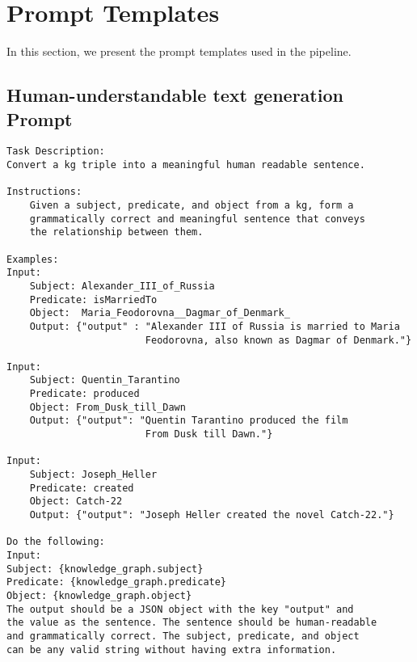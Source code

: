 \chapter{Prompt Templates}\label{ch:prompt-templates}
In this section, we present the prompt templates used in the pipeline.
\section{Human-understandable text generation Prompt}\label{sec:prompt-templates:human-understandable}
\begin{Verbatim}[fontsize=\small, frame=single, label={Prompt template for generating human-readable text}]
Task Description:
Convert a kg triple into a meaningful human readable sentence.

Instructions:
    Given a subject, predicate, and object from a kg, form a
    grammatically correct and meaningful sentence that conveys
    the relationship between them.

Examples:
Input:
    Subject: Alexander_III_of_Russia
    Predicate: isMarriedTo
    Object:  Maria_Feodorovna__Dagmar_of_Denmark_
    Output: {"output" : "Alexander III of Russia is married to Maria
                        Feodorovna, also known as Dagmar of Denmark."}

Input:
    Subject: Quentin_Tarantino
    Predicate: produced
    Object: From_Dusk_till_Dawn
    Output: {"output": "Quentin Tarantino produced the film
                        From Dusk till Dawn."}

Input:
    Subject: Joseph_Heller
    Predicate: created
    Object: Catch-22
    Output: {"output": "Joseph Heller created the novel Catch-22."}

Do the following:
Input:
Subject: {knowledge_graph.subject}
Predicate: {knowledge_graph.predicate}
Object: {knowledge_graph.object}
The output should be a JSON object with the key "output" and
the value as the sentence. The sentence should be human-readable
and grammatically correct. The subject, predicate, and object
can be any valid string without having extra information.
\end{Verbatim}


